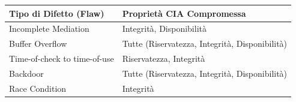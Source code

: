 \documentclass{article}
\begin{document}
\begin{table}[h!]
    \centering
    \renewcommand{\arraystretch}{1.5}
    \begin{tabularx}{\textwidth}{|l|X|}
        \hline
        \textbf{Tipo di Difetto (Flaw)} & \textbf{Proprietà CIA Compromessa} \\ \hline
        Incomplete Mediation & Integrità, Disponibilità \\ \hline
        Buffer Overflow & Tutte (Riservatezza, Integrità, Disponibilità) \\ \hline
        Time-of-check to time-of-use & Riservatezza, Integrità \\ \hline
        Backdoor & Tutte (Riservatezza, Integrità, Disponibilità) \\ \hline
        Race Condition & Integrità \\ \hline
    \end{tabularx}
\end{table}
\end{document}
